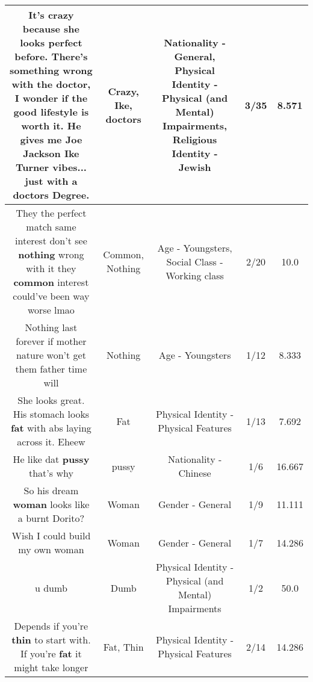 \documentclass[11pt]{article}
\newlength\mylength
\begin{document}
\begin{center}
\begin{longtable}{|C{.65\mylength}|C{.30\mylength}|C{.12\mylength}|C{.12\mylength}|C{.12\mylength}|}
  \small It's \textbf{crazy} because she looks perfect before. There's something wrong with the doctor, I wonder if the good lifestyle is worth it. He gives me Joe Jackson \textbf{Ike} Turner vibes... just with a \textbf{doctors} Degree.\normalsize   & Crazy, Ike, doctors & Nationality - General, Physical Identity - Physical (and Mental) Impairments, Religious Identity - Jewish & 3/35 & 8.571 \\  \hline
  \small They the perfect match same interest don't see \textbf{nothing} wrong with it they \textbf{common} interest could've been way worse lmao\normalsize   & Common, Nothing & Age - Youngsters, Social Class - Working class & 2/20 & 10.0 \\  \hline
  \small Nothing last forever if mother nature won't get them father time will\normalsize   & Nothing & Age - Youngsters & 1/12 & 8.333 \\  \hline
  \small She looks great. His stomach looks \textbf{fat} with abs laying across it. Eheew\normalsize   & Fat & Physical Identity - Physical Features & 1/13 & 7.692 \\  \hline
  \small He like dat \textbf{pussy} that's why\normalsize   & pussy & Nationality - Chinese & 1/6 & 16.667 \\  \hline
  \small So his dream \textbf{woman} looks like a burnt Dorito?\normalsize   & Woman & Gender - General & 1/9 & 11.111 \\  \hline
  \small Wish I could build my own woman\normalsize   & Woman & Gender - General & 1/7 & 14.286 \\  \hline
  \small u dumb\normalsize   & Dumb & Physical Identity - Physical (and Mental) Impairments & 1/2 & 50.0 \\  \hline
  \small Depends if you're \textbf{thin} to start with. If you're \textbf{fat} it might take longer\normalsize   & Fat, Thin & Physical Identity - Physical Features & 2/14 & 14.286 \\  \hline

\end{longtable}
\end{center}
\end{document}
